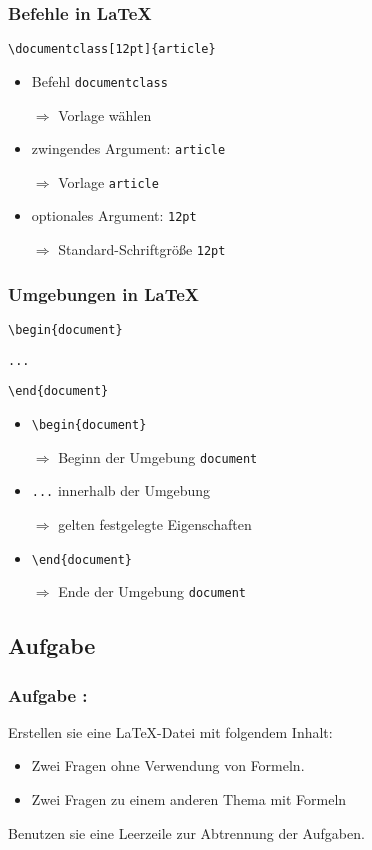 \documentclass{beamer}
\newcounter{aufgabe}
\begin{document}
\begin{frame}
  \frametitle{Befehle in \LaTeX}

   \texttt{\textbackslash documentclass[12pt]\{article\}}

\begin{itemize}
  \item<1-> Befehl \texttt{documentclass}

       $\Longrightarrow$ Vorlage wählen
  \item<2-> zwingendes Argument: \texttt{article} 

       $\Longrightarrow$ Vorlage \texttt{article}
  \item<3-> optionales Argument: \texttt{12pt}

       $\Longrightarrow$ Standard-Schriftgröße \texttt{12pt}
\end{itemize}
\end{frame}




\begin{frame}
  \frametitle{Umgebungen in \LaTeX}

   \texttt{\textbackslash begin\{document\}}

   \texttt{\quad ...}

   \texttt{\textbackslash end\{document\}}

\begin{itemize}
  \item<1-> \texttt{\textbackslash begin\{document\}}
 
       $\Longrightarrow$ Beginn der Umgebung \texttt{document}
  \item<2-> \texttt{...} innerhalb der Umgebung

       $\Longrightarrow$ gelten festgelegte Eigenschaften
  \item<3-> \texttt{\textbackslash end\{document\}}
 
       $\Longrightarrow$ Ende der Umgebung \texttt{document}
\end{itemize}
\end{frame}




\subsection{Aufgabe \theaufgabe}


\begin{frame}
  \frametitle{Aufgabe \theaufgabe:}

 Erstellen sie eine \LaTeX -Datei mit folgendem Inhalt:

  \begin{itemize}
  \item<1-> Zwei Fragen ohne Verwendung von Formeln.
  \item<1-> Zwei Fragen zu einem anderen Thema mit Formeln
  \end{itemize}

  Benutzen sie eine Leerzeile zur Abtrennung der Aufgaben.
\end{frame}
\end{document}
